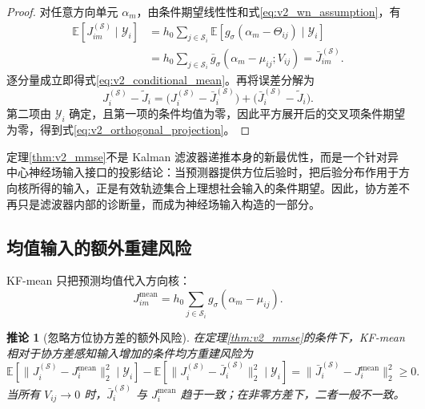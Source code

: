 \documentclass[UTF8,fontset=windows,11pt]{ctexart}
\theoremstyle{cnplain}
\newtheorem{corollary}[theorem]{推论}
\numberwithin{equation}{section}
\newcommand{\E}{\mathbb E}
\begin{document}
\begin{proof}
对任意方向单元 $\alpha_m$，由条件期望线性性和式\eqref{eq:v2_wn_assumption}，有
\begin{equation}
 \begin{aligned}
 \E[J_{im}^{(\mathcal S)}\mid\mathcal Y_i]
 &=h_0\sum_{j\in\mathcal S_i}
 \E[g_\sigma(\alpha_m-\Theta_{ij})\mid\mathcal Y_i]\\
 &=h_0\sum_{j\in\mathcal S_i}
 \bar g_\sigma(\alpha_m-\mu_{ij};V_{ij})
 =\bar J_{im}^{(\mathcal S)}.
 \end{aligned}
 \label{eq:v2_component_expectation}
\end{equation}
逐分量成立即得式\eqref{eq:v2_conditional_mean}。再将误差分解为
\begin{equation}
 J_i^{(\mathcal S)}-\widetilde J_i
 =\bigl(J_i^{(\mathcal S)}-\bar J_i^{(\mathcal S)}\bigr)
 +\bigl(\bar J_i^{(\mathcal S)}-\widetilde J_i\bigr).
 \label{eq:v2_error_decomposition}
\end{equation}
第二项由 $\mathcal Y_i$ 确定，且第一项的条件均值为零，因此平方展开后的交叉项条件期望为零，得到式\eqref{eq:v2_orthogonal_projection}。
\end{proof}

定理\ref{thm:v2_mmse}不是 Kalman 滤波器递推本身的新最优性，而是一个针对异中心神经场输入接口的投影结论：当预测器提供方位后验时，把后验分布作用于方向核所得的输入，正是有效轨迹集合上理想社会输入的条件期望。因此，协方差不再只是滤波器内部的诊断量，而成为神经场输入构造的一部分。

\subsection{均值输入的额外重建风险}

KF-mean 只把预测均值代入方向核：
\begin{equation}
 J_{im}^{\mathrm{mean}}=h_0\sum_{j\in\mathcal S_i}
 g_\sigma(\alpha_m-\mu_{ij}).
 \label{eq:v2_mean_input}
\end{equation}

\begin{corollary}[忽略方位协方差的额外风险]
\label{cor:v2_mean_risk}
在定理\ref{thm:v2_mmse}的条件下，KF-mean 相对于协方差感知输入增加的条件均方重建风险为
\begin{equation}
 \E[\|J_i^{(\mathcal S)}-J_i^{\mathrm{mean}}\|_2^2\mid\mathcal Y_i]
 -\E[\|J_i^{(\mathcal S)}-\bar J_i^{(\mathcal S)}\|_2^2\mid\mathcal Y_i]
 =\|\bar J_i^{(\mathcal S)}-J_i^{\mathrm{mean}}\|_2^2\ge0.
 \label{eq:v2_mean_risk_gap}
\end{equation}
当所有 $V_{ij}\to0$ 时，$\bar J_i^{(\mathcal S)}$ 与 $J_i^{\mathrm{mean}}$ 趋于一致；在非零方差下，二者一般不一致。
\end{corollary}
\end{document}
